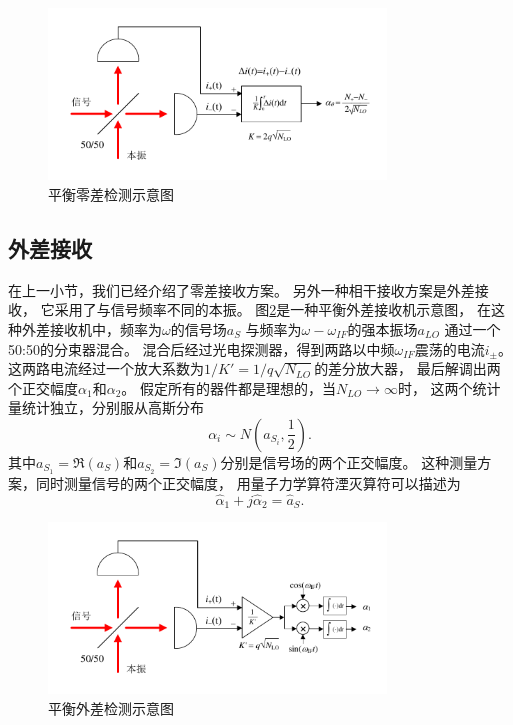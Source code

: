 \begin{figure}
\centering
  \includegraphics[width=0.8\textwidth]{figures/chap2/homodyne-receiver.pdf}
  \caption{平衡零差检测示意图}
  \label{fig:HD}
\end{figure}

\subsection{外差接收}
在上一小节，我们已经介绍了零差接收方案。
另外一种相干接收方案是外差接收\cite{gagliardi1976optical,gagliardi1998optical}，
它采用了与信号频率不同的本振。
图\ref{fig:HeD}是一种平衡外差接收机示意图，
在这种外差接收机中，频率为$\omega$的信号场$a_S$
与频率为$\omega - \omega_{IF}$的强本振场$a_{LO}$
通过一个50:50的分束器混合。
混合后经过光电探测器，得到两路以中频$\omega_{IF}$震荡的电流$i_\pm$。
这两路电流经过一个放大系数为$1/K'=1/q\sqrt{N_{LO}}$的差分放大器，
最后解调出两个正交幅度$\alpha_1$和$\alpha_2$。
假定所有的器件都是理想的，当$N_{LO} \rightarrow \infty$时，
这两个统计量统计独立，分别服从高斯分布
\begin{equation}
\alpha_i \sim N(a_{S_i}, \frac{1}{2}).
\label{eq:Her-receiver-output}
\end{equation}
其中$a_{S_1}=\Re(a_S)$和$a_{S_2}=\Im(a_S)$分别是信号场的两个正交幅度。
这种测量方案，同时测量信号的两个正交幅度，
用量子力学算符湮灭算符可以描述为\cite{yuen1980optical,mandel1995optical}
\begin{equation}
\hat{\alpha}_1 + j \hat{\alpha}_2 = \hat{a}_S.
\label{eq:Her-receiver-output-2}
\end{equation}



\begin{figure}
\centering
  \includegraphics[width=0.8\textwidth]{figures/chap2/heretrodyne-receiver.pdf}
  \caption{平衡外差检测示意图}
  \label{fig:HeD}
\end{figure}


